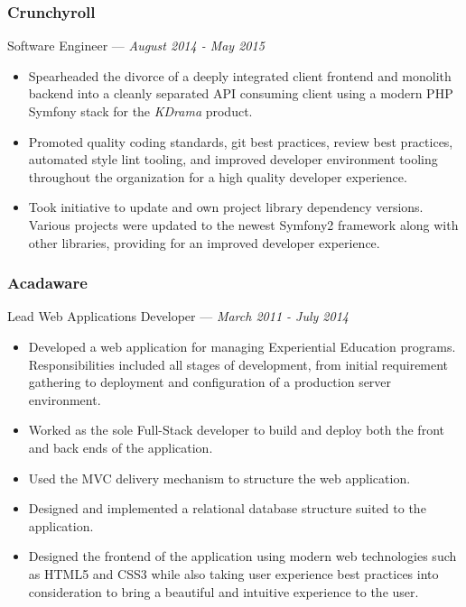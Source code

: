 \documentclass[letterpaper,10pt]{article}
\begin{document}
\subsubsection{Crunchyroll}
\hfill Software Engineer --- \emph{August 2014 - May 2015}

\begin{itemize}
\tightlist{}
\item
  Spearheaded the divorce of a deeply integrated client frontend and monolith
  backend into a cleanly separated API consuming client using a modern PHP
  Symfony stack for the \emph{KDrama} product.
\item
  Promoted quality coding standards, git best practices, review best
  practices, automated style lint tooling, and improved developer environment
  tooling throughout the organization for a high quality developer
  experience.
\item
  Took initiative to update and own project library dependency versions.
  Various projects were updated to the newest Symfony2 framework along with
  other libraries, providing for an improved developer experience.
\end{itemize}

\subsubsection{Acadaware}
\hfill Lead Web Applications Developer --- \emph{March 2011 - July 2014}

\begin{itemize}
\tightlist{}
\item
  Developed a web application for managing Experiential Education
  programs. Responsibilities included all stages of development, from initial
  requirement gathering to deployment and configuration of a production server
  environment.
\item
  Worked as the sole Full-Stack developer to build and deploy both the front
  and back ends of the application.
\item
  Used the MVC delivery mechanism to structure the web application.
\item
  Designed and implemented a relational database structure suited to the
  application.
\item
  Designed the frontend of the application using modern web technologies such
  as HTML5 and CSS3 while also taking user experience best practices into
  consideration to bring a beautiful and intuitive experience to the user.
\end{itemize}
\end{document}
